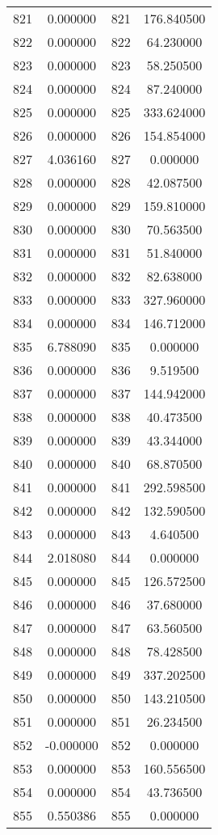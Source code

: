 \documentclass[12pt]{article}
\begin{document}
\begin{longtable}{@{}cccc@{}}
821 & 0.000000 & 821 & 176.840500 \\
822 & 0.000000 & 822 & 64.230000 \\
823 & 0.000000 & 823 & 58.250500 \\
824 & 0.000000 & 824 & 87.240000 \\
825 & 0.000000 & 825 & 333.624000 \\
826 & 0.000000 & 826 & 154.854000 \\
827 & 4.036160 & 827 & 0.000000 \\
828 & 0.000000 & 828 & 42.087500 \\
829 & 0.000000 & 829 & 159.810000 \\
830 & 0.000000 & 830 & 70.563500 \\
831 & 0.000000 & 831 & 51.840000 \\
832 & 0.000000 & 832 & 82.638000 \\
833 & 0.000000 & 833 & 327.960000 \\
834 & 0.000000 & 834 & 146.712000 \\
835 & 6.788090 & 835 & 0.000000 \\
836 & 0.000000 & 836 & 9.519500 \\
837 & 0.000000 & 837 & 144.942000 \\
838 & 0.000000 & 838 & 40.473500 \\
839 & 0.000000 & 839 & 43.344000 \\
840 & 0.000000 & 840 & 68.870500 \\
841 & 0.000000 & 841 & 292.598500 \\
842 & 0.000000 & 842 & 132.590500 \\
843 & 0.000000 & 843 & 4.640500 \\
844 & 2.018080 & 844 & 0.000000 \\
845 & 0.000000 & 845 & 126.572500 \\
846 & 0.000000 & 846 & 37.680000 \\
847 & 0.000000 & 847 & 63.560500 \\
848 & 0.000000 & 848 & 78.428500 \\
849 & 0.000000 & 849 & 337.202500 \\
850 & 0.000000 & 850 & 143.210500 \\
851 & 0.000000 & 851 & 26.234500 \\
852 & -0.000000 & 852 & 0.000000 \\
853 & 0.000000 & 853 & 160.556500 \\
854 & 0.000000 & 854 & 43.736500 \\
855 & 0.550386 & 855 & 0.000000 \\

\end{longtable}
\end{document}

